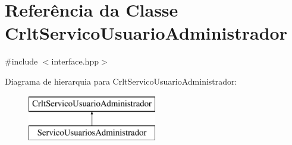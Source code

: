 \hypertarget{class_crlt_servico_usuario_administrador}{}\section{Referência da Classe Crlt\+Servico\+Usuario\+Administrador}
\label{class_crlt_servico_usuario_administrador}


{\ttfamily \#include $<$interface.\+hpp$>$}

Diagrama de hierarquia para Crlt\+Servico\+Usuario\+Administrador\+:\begin{figure}[H]
\begin{center}
\leavevmode
\includegraphics[height=2.000000cm]{class_crlt_servico_usuario_administrador}
\end{center}
\end{figure}
